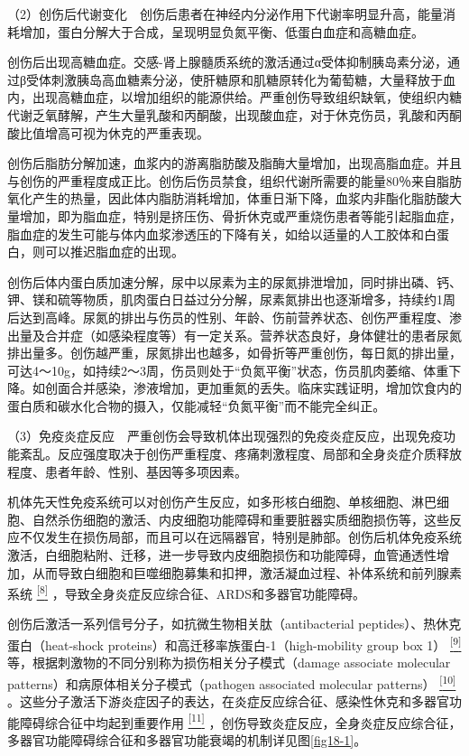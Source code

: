 （2）创伤后代谢变化　创伤后患者在神经内分泌作用下代谢率明显升高，能量消耗增加，蛋白分解大于合成，呈现明显负氮平衡、低蛋白血症和高糖血症。

创伤后出现高糖血症。交感-肾上腺髓质系统的激活通过α受体抑制胰岛素分泌，通过β受体刺激胰岛高血糖素分泌，使肝糖原和肌糖原转化为葡萄糖，大量释放于血内，出现高糖血症，以增加组织的能源供给。严重创伤导致组织缺氧，使组织内糖代谢乏氧酵解，产生大量乳酸和丙酮酸，出现酸血症，对于休克伤员，乳酸和丙酮酸比值增高可视为休克的严重表现。

创伤后脂肪分解加速，血浆内的游离脂肪酸及脂酶大量增加，出现高脂血症。并且与创伤的严重程度成正比。创伤后伤员禁食，组织代谢所需要的能量80％来自脂肪氧化产生的热量，因此体内脂肪消耗增加，体重日渐下降，血浆内非酯化脂肪酸大量增加，即为脂血症，特别是挤压伤、骨折休克或严重烧伤患者等能引起脂血症，脂血症的发生可能与体内血浆渗透压的下降有关，如给以适量的人工胶体和白蛋白，则可以推迟脂血症的出现。

创伤后体内蛋白质加速分解，尿中以尿素为主的尿氮排泄增加，同时排出磷、钙、钾、镁和硫等物质，肌肉蛋白日益过分分解，尿素氮排出也逐渐增多，持续约1周后达到高峰。尿氮的排出与伤员的性别、年龄、伤前营养状态、创伤严重程度、渗出量及合并症（如感染程度等）有一定关系。营养状态良好，身体健壮的患者尿氮排出量多。创伤越严重，尿氮排出也越多，如骨折等严重创伤，每日氮的排出量，可达4～10g，如持续2～3周，伤员则处于“负氮平衡”状态，伤员肌肉萎缩、体重下降。如创面合并感染，渗液增加，更加重氮的丢失。临床实践证明，增加饮食内的蛋白质和碳水化合物的摄入，仅能减轻“负氮平衡”而不能完全纠正。

（3）免疫炎症反应　严重创伤会导致机体出现强烈的免疫炎症反应，出现免疫功能紊乱。反应强度取决于创伤严重程度、疼痛刺激程度、局部和全身炎症介质释放程度、患者年龄、性别、基因等多项因素。

机体先天性免疫系统可以对创伤产生反应，如多形核白细胞、单核细胞、淋巴细胞、自然杀伤细胞的激活、内皮细胞功能障碍和重要脏器实质细胞损伤等，这些反应不仅发生在损伤局部，而且可以在远隔器官，特别是肺部。创伤后机体免疫系统激活，白细胞粘附、迁移，进一步导致内皮细胞损伤和功能障碍，血管通透性增加，从而导致白细胞和巨噬细胞募集和扣押，激活凝血过程、补体系统和前列腺素系统
\protect\hyperlink{text00024.htmlux5cux23ch8-23}{\textsuperscript{{[}8{]}}}
，导致全身炎症反应综合征、ARDS和多器官功能障碍。

创伤后激活一系列信号分子，如抗微生物相关肽（antibacterial
peptides）、热休克蛋白（heat-shock
proteins）和高迁移率族蛋白-1（high-mobility group box 1）
\protect\hyperlink{text00024.htmlux5cux23ch9-23}{\textsuperscript{{[}9{]}}}
等，根据刺激物的不同分别称为损伤相关分子模式（damage associate molecular
patterns）和病原体相关分子模式（pathogen associated molecular patterns）
\protect\hyperlink{text00024.htmlux5cux23ch10-23}{\textsuperscript{{[}10{]}}}
。这些分子激活下游炎症因子的表达，在炎症反应综合征、感染性休克和多器官功能障碍综合征中均起到重要作用
\protect\hyperlink{text00024.htmlux5cux23ch11-23}{\textsuperscript{{[}11{]}}}
，创伤导致炎症反应，全身炎症反应综合征，多器官功能障碍综合征和多器官功能衰竭的机制详见图\ref{fig18-1}。

